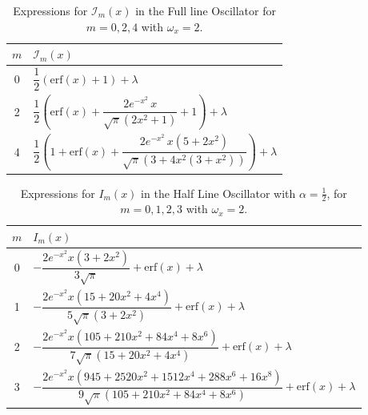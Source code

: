\documentclass[12pt]{article}
\begin{document}
\begin{table}[h!]
\centering
\setlength{\tabcolsep}{1em}
\renewcommand{\arraystretch}{1.5}
\begin{tabular}{c|l}
\hline
$m$ & $\mathcal{I}_m(x)$ \\ \hline
0 & $\dfrac{1}{2}\left(\mathrm{erf}(x)+1\right) + \lambda$ \\ 
2 & $\dfrac{1}{2}\left(\mathrm{erf}(x) + \dfrac{2 e^{-x^2}\,x}{\sqrt{\pi}(2x^2+1)} + 1\right) + \lambda$ \\ 
4 & $\dfrac{1}{2}\left(1 + \mathrm{erf}(x) + \dfrac{2 e^{-x^2}\,x(5+2x^2)}{\sqrt{\pi}(3+4x^2(3+x^2))}\right) + \lambda$ \\ \hline
\end{tabular}
\caption{Expressions for $\mathcal{I}_m(x)$ in the Full line Oscillator for $m=0,2,4$ with $\omega_x=2$.}
\label{tab:Im-values}
\end{table}


\begin{table}[h!]
\centering
\setlength{\tabcolsep}{1em}
\renewcommand{\arraystretch}{1.6}
\begin{tabular}{c|l}
\hline
$m$ & $I_m(x)$ \\ \hline
0 & $-\dfrac{2 e^{-x^2}x(3+2x^2)}{3\sqrt{\pi}} + \mathrm{erf}(x) + \lambda$ \\[0.8em]
1 & $-\dfrac{2 e^{-x^2}x(15+20x^2+4x^4)}{5\sqrt{\pi}(3+2x^2)} + \mathrm{erf}(x) + \lambda$ \\[0.8em]
2 & $-\dfrac{2 e^{-x^2}x(105+210x^2+84x^4+8x^6)}{7\sqrt{\pi}(15+20x^2+4x^4)} + \mathrm{erf}(x) + \lambda$ \\[0.8em]
3 & $-\dfrac{2 e^{-x^2}x(945+2520x^2+1512x^4+288x^6+16x^8)}{9\sqrt{\pi}(105+210x^2+84x^4+8x^6)} + \mathrm{erf}(x) + \lambda$ \\ \hline
\end{tabular}
\caption{Expressions for $I_m(x)$ in the Half Line Oscillator with $\alpha=\tfrac{1}{2}$, for $m=0,1,2,3$ with $\omega_x=2$.}
\label{tab:I0-halfline}
\end{table}
\end{document}
